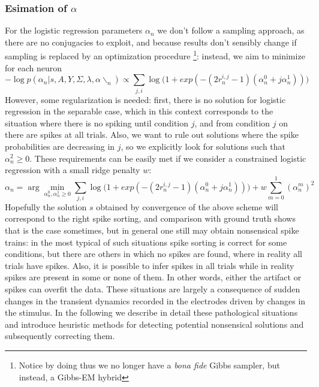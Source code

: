 \documentclass[12pt,letterpaper,fleqn]{article}
\begin{document}
\subsubsection{Esimation of $\alpha$}
For the logistic regression parameters $\alpha_n$ we don't follow a sampling approach, as there are no conjugacies to exploit, and because results don't sensibly change if sampling is replaced by an optimization procedure  \footnote{Notice by doing thus we no longer have a \textit{bona fide} Gibbs sampler, but instead, a Gibbs-EM hybrid}: instead, we aim to minimize for each neuron
$$- \log p(\alpha_n|s,A,Y,\Sigma,\lambda,\alpha\backslash_{n})\propto \sum_{j,i} \log\big(1+exp\left(-(2r_n^{i,j}-1)(\alpha_n^0+j\alpha_n^1)\right)\big)$$
 However, some regularization is needed: first, there is no solution for logistic regression in the separable case, which in this context corresponds to the situation where there is no spiking until condition $j$, and from condition $j$ on there are spikes at all trials. Also, we want to rule out solutions where the spike probabilities are decreasing in $j$, so we explicitly look for solutions such that $\alpha_n^2\geq 0$. These requirements can be easily met if we consider a constrained logistic regression with a small ridge penalty $w$:
$$ \alpha_n=\arg\min_{\alpha_n^0,\alpha_n^1\geq 0} \sum_{j,i} \log\big(1+exp\left(-(2r_n^{i,j}-1)(\alpha_n^0+j\alpha_n^1)\right)\big)+w\sum_{m=0}^1(\alpha_n^m)^2 $$ 
Hopefully the solution $s$ obtained by convergence of the above scheme will correspond to the right spike sorting, and comparison with ground truth shows that is the case sometimes, but in general one still may obtain nonsensical spike trains: in the most typical of such situations spike sorting is correct for some conditions, but there are others in which no spikes are found, where in reality all trials have spikes. Also, it is possible to infer spikes in all trials while in reality spikes are present in some or none of them. In other words, either the artifact or spikes can overfit the data. These situations are largely a consequence of sudden changes in the transient dynamics recorded in the electrodes driven by changes in the stimulus. In the following we describe in detail these pathological situations and introduce heuristic methods for detecting potential nonsensical solutions and subsequently correcting them.
\end{document}
